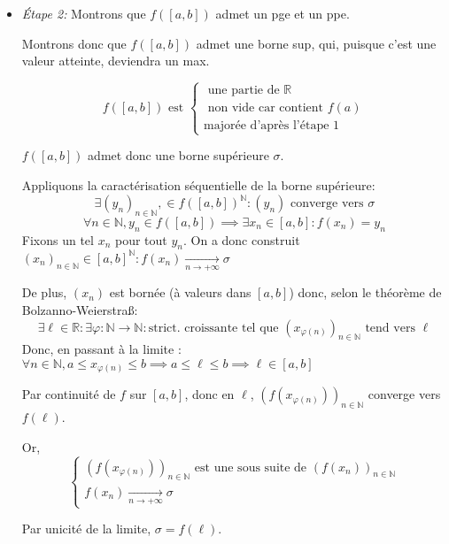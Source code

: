 \documentclass{article}
\renewenvironment{question_kholle}[2][ ]
{
	\subsection{\texorpdfstring{#2}{}}
	\notblank{#1}
	{
		\noindent #1
		\bigbreak
	}
	{}
	\begin{proof}
}
{
	\end{proof}
}
\begin{document}
\begin{question_kholle}
\begin{itemize}
		donc $(f(x_{\varphi(n)}))_{n \in \mathbb{N}}$, tend vers $+ \infty$, ce qui est absurde, donc $f$ est majorée.
		
		On fait de même pour la minoration.
		
		\item  \emph{Étape 2:} Montrons que $f([a, b])$ admet un pge et un ppe.
		
		Montrons donc que $f([a, b])$ admet une borne sup, qui, puisque c'est une valeur atteinte, deviendra un max.
		
		$$
		f([a, b]) \text{ est } \left\{ \begin{array}{ll}
		\text{ une partie de } \mathbb{R} \\
		\text{ non vide car contient } f(a) \\
		\text{majorée d'après l'étape 1}
		\end{array}\right.
		$$
		
		$f([a, b])$ admet donc une borne supérieure $\sigma$.
		
		Appliquons la caractérisation séquentielle de la borne supérieure:
		$$
		\exists (y_{n})_{n \in \mathbb{N}}, \in f([a, b])^{\mathbb{N}} : (y_{n}) \text{ converge vers } \sigma
		$$
		$$
		\forall n \in \mathbb{N}, y_{n} \in f([a, b]) \implies \exists x_{n} \in [a, b] : f(x_{n} ) = y_{n}
		$$
		Fixons un tel $x_{n}$ pour tout $y_{n}$.
		On a donc construit $(x_{n})_{n \in \mathbb{N}} \in [a, b]^{\mathbb{N}} : f(x_{n}) \xrightarrow[n \to +\infty]{} \sigma$
		
		De plus, $(x_{n})$ est bornée (à valeurs dans $[a, b]$) donc, selon le théorème de Bolzanno-Weierstraß:
		$$
		\exists \ell \in \mathbb{R} : \exists \varphi : \mathbb{N} \to \mathbb{N} : \text{strict. croissante tel que } (x_{\varphi(n)})_{n \in \mathbb{N}} \text{ tend vers } \ell
		$$
		Donc, en passant à la limite : $\forall n \in \mathbb{N}, a \leqslant x_{\varphi(n)} \leqslant b \implies a \leqslant \ell \leqslant b \implies \ell \in [a, b]$


		Par continuité de $f$ sur $[a, b]$, donc en $\ell$, $(f(x_{\varphi(n)}))_{n \in \mathbb{N}}$ converge vers $f(\ell)$.
		
		Or,
		$$
		\left\{ \begin{array}{ll}
		(f(x_{\varphi(n)}))_{n \in \mathbb{N}} \text{ est une sous suite de } (f(x_{n}))_{n \in \mathbb{N}} \\
		f(x_{n}) \xrightarrow[n \to + \infty]{} \sigma
		\end{array}\right.$$
		
		Par unicité de la limite, $\sigma = f(\ell)$.
		

\end{itemize}
\end{question_kholle}
\end{document}
